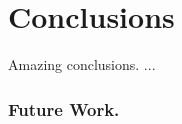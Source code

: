 \documentclass[main.tex]{subfiles}
\begin{document}

\section{Conclusions}
\label{sec:conclusions}

Amazing conclusions.
...
\cite{}

\subsubsection*{Future Work.}
\label{ssec:future-work}
\end{document}
